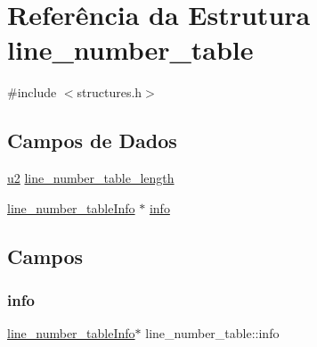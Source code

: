 \hypertarget{structline__number__table}{}\section{Referência da Estrutura line\+\_\+number\+\_\+table}
\label{structline__number__table}


{\ttfamily \#include $<$structures.\+h$>$}

\subsection*{Campos de Dados}
\begin{DoxyCompactItemize}
\item 
\hyperlink{lista__operandos_8h_a732cde1300aafb73b0ea6c2558a7a54f}{u2} \hyperlink{structline__number__table_abe258fd7b751d3d72da9b207afd11beb}{line\+\_\+number\+\_\+table\+\_\+length}
\item 
\hyperlink{structline__number__tableInfo}{line\+\_\+number\+\_\+table\+Info} $\ast$ \hyperlink{structline__number__table_a1d2c6e92d6243f7753d153cc11313ad9}{info}
\end{DoxyCompactItemize}


\subsection{Campos}
\mbox{\label{structline__number__table_a1d2c6e92d6243f7753d153cc11313ad9}} 
\subsubsection{\texorpdfstring{info}{info}}
{\footnotesize\ttfamily \hyperlink{structline__number__tableInfo}{line\+\_\+number\+\_\+table\+Info}$\ast$ line\+\_\+number\+\_\+table\+::info}

\mbox{\label{structline__number__table_abe258fd7b751d3d72da9b207afd11beb}} 
